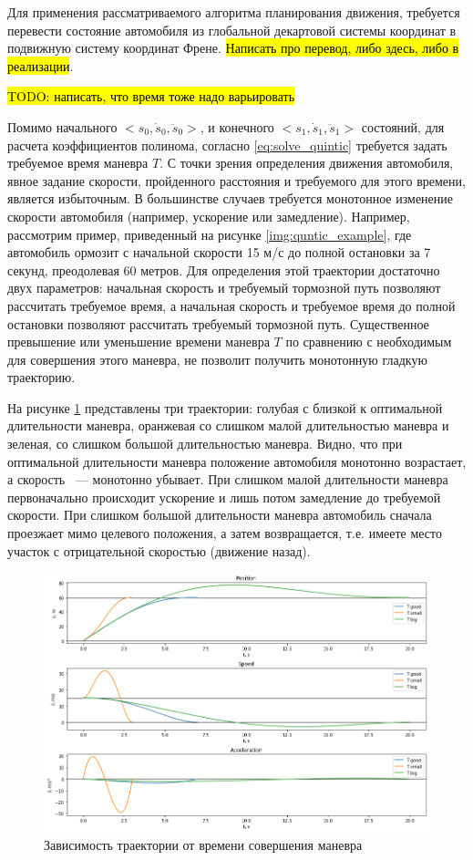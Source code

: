 Для применения рассматриваемого алгоритма планирования движения, требуется перевести состояние автомобиля из
глобальной декартовой системы координат в подвижную систему координат Френе. \hl{Написать про перевод, либо здесь,
либо в реализации}.

\hl{TODO: написать, что время тоже надо варьировать}

Помимо начального $<s_0, \dot{s}_0, \ddot{s}_0>$, и конечного $<s_1, \dot{s}_1, \ddot{s}_1>$ состояний, для расчета
коэффициентов полинома, согласно \ref{eq:solve_quintic} требуется задать требуемое время маневра $T$. С точки зрения
определения движения автомобиля, явное задание скорости, пройденного расстояния и требуемого для этого времени, является
избыточным. В большинстве случаев требуется монотонное изменение скорости автомобиля (например, ускорение или
замедление). Например, рассмотрим пример, приведенный на рисунке \ref{img:quntic_example}, где автомобиль
ормозит с начальной скорости 15 м/с до полной остановки за 7 секунд, преодолевая 60 метров. Для определения этой траектории
достаточно двух параметров: начальная скорость и требуемый тормозной путь позволяют рассчитать требуемое время, а
начальная скорость и требуемое время до полной остановки позволяют рассчитать требуемый тормозной путь. Существенное
превышение или уменьшение времени маневра $T$ по сравнению с необходимым для совершения этого маневра, не позволит
получить монотонную гладкую траекторию.

На рисунке \ref{img:quntic_bad_t} представлены три траектории:
голубая с близкой к оптимальной длительности маневра, оранжевая со слишком малой длительностью маневра и зеленая, со
слишком большой длительностью маневра. Видно, что при оптимальной длительности маневра положение автомобиля монотонно
возрастает, а скорость ~--- монотонно убывает. При слишком малой длительности маневра первоначально происходит
ускорение и лишь потом замедление до требуемой скорости. При слишком большой длительности маневра автомобиль сначала
проезжает мимо целевого положения, а затем возвращается, т.е. имеете место участок с отрицательной скоростью
(движение назад).

\begin{figure}[h]
      \centering
      \includegraphics[width=\linewidth]{images/quintic_bad_t}
      \caption{Зависимость траектории от времени совершения маневра}
      \label{img:quntic_bad_t}
\end{figure}


